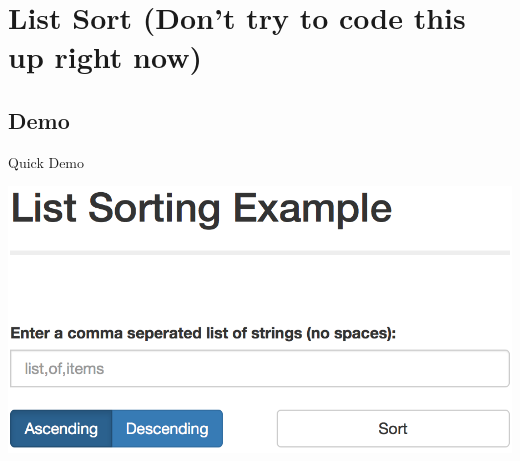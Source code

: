 \documentclass{beamer}
\begin{document}
\section[List Sort]{List Sort \newline (Don't try to code this up right now)}
\subsection{Demo}
	\begin{frame}[t]{Quick Demo}
		\vfill
		\begin{center}
			\href{http://127.0.0.1:5000}{\includegraphics[scale=0.4]{images/list-sort.png}}
		\end{center}
		\vfill
	\end{frame}
\end{document}
